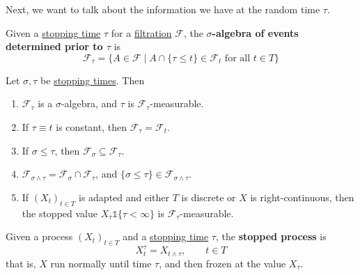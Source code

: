 	Next, we want to talk about the information we have at the random time $\tau$. 

	\begin{definition}
	  \label{def:sigma-algebra-stopping-time}
		Given a \hyperref[def:stopping-time]{stopping time} $\tau$ for a \hyperref[def:filtration]{filtration} $\mathscr{F}$, the \textbf{$\sigma$-algebra of events determined prior to $\tau$} is 
		\begin{equation}
			\mathcal{F}_\tau = \big\{ A \in \mathcal{F} \;\big|\; A \cap \{\tau \leq t\} \in \mathcal{F}_t \text{ for all } t \in T \big\}
		\end{equation}
	\end{definition}

	\begin{lemma}
	  \label{lem:properties-of-f-tau}
		Let $\sigma, \tau$ be \hyperref[def:stopping-time]{stopping times}. Then 
		\begin{enumerate}
			\item $\mathcal{F}_\tau$ is a $\sigma$-algebra, and $\tau$ is $\mathcal{F}_\tau$-measurable. 
			\item If $\tau \equiv t$ is constant, then $\mathcal{F}_\tau = \mathcal{F}_t$. 
			\item If $\sigma \leq \tau$, then $\mathcal{F}_\sigma \subseteq \mathcal{F}_\tau$. 
			\item $\mathcal{F}_{\sigma \wedge \tau} = \mathcal{F}_\sigma \cap \mathcal{F}_\tau$, and $\{\sigma \leq \tau\} \in \mathcal{F}_{\sigma \wedge \tau}$. 
			\item If $(X_t)_{t \in T}$ is adapted and either $T$ is discrete or $X$ is right-continuous, then the stopped value $X_\tau \mathbb{1}\{\tau < \infty\}$ is $\mathcal{F}_\tau$-measurable. 
		\end{enumerate}
	\end{lemma}

	\begin{definition}
	  \label{def:stopped-process}
		Given a process $(X_t)_{t \in T}$ and a \hyperref[def:stopping-time]{stopping time} $\tau$, the \textbf{stopped process} is 
		\begin{equation}
			X_t^\tau = X_{t \wedge \tau}, \qquad t \in T
		\end{equation}
		that is, $X$ run normally until time $\tau$, and then frozen at the value $X_\tau$. 
	\end{definition}


